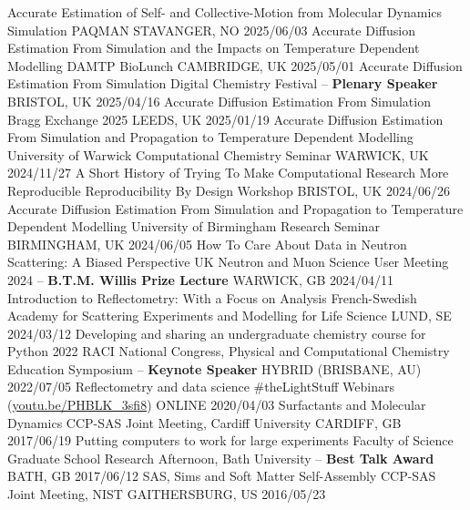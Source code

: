 \vspace{-0.4cm}
\begin{cvhonors}
  \cvhonor
    {Accurate Estimation of Self- and Collective-Motion from Molecular Dynamics Simulation}
    {PAQMAN}
    {STAVANGER, NO}
    {2025/06/03}
  \cvhonor
    {Accurate Diffusion Estimation From Simulation and the Impacts on Temperature Dependent Modelling}
    {DAMTP BioLunch}
    {CAMBRIDGE, UK}
    {2025/05/01}
  \cvhonor
    {Accurate Diffusion Estimation From Simulation}
    {Digital Chemistry Festival -- \textbf{Plenary Speaker}} 
    {BRISTOL, UK}
    {2025/04/16}  
  \cvhonor
    {Accurate Diffusion Estimation From Simulation}
    {Bragg Exchange 2025}
    {LEEDS, UK}
    {2025/01/19}
  \cvhonor
    {Accurate Diffusion Estimation From Simulation and Propagation to Temperature Dependent Modelling}
    {University of Warwick Computational Chemistry Seminar}
    {WARWICK, UK}
    {2024/11/27}
  \cvhonor
    {A Short History of Trying To Make Computational Research More Reproducible}
    {Reproducibility By Design Workshop}
    {BRISTOL, UK}
    {2024/06/26}
  \cvhonor
    {Accurate Diffusion Estimation From Simulation and Propagation to Temperature Dependent Modelling}
    {University of Birmingham Research Seminar}
    {BIRMINGHAM, UK}
    {2024/06/05}
  \cvhonor
    {How To Care About Data in Neutron Scattering: A Biased Perspective}
    {UK Neutron and Muon Science User Meeting 2024 -- \textbf{B.T.M. Willis Prize Lecture}}
    {WARWICK, GB}
    {2024/04/11}
  \cvhonor
    {Introduction to Reflectometry: With a Focus on Analysis}
    {French-Swedish Academy for Scattering Experiments and Modelling for Life Science}
    {LUND, SE}
    {2024/03/12}
  \cvhonor
    {Developing and sharing an undergraduate chemistry course for Python}
    {2022 RACI National Congress, Physical and Computational Chemistry Education Symposium -- \textbf{Keynote Speaker}}
    {HYBRID (BRISBANE, AU)}
    {2022/07/05}
  \cvhonor
    {Reflectometry and data science}
    {\#theLightStuff Webinars (\href{https://youtu.be/PHBLK_3sfi8}{youtu.be/PHBLK\_3sfi8})}
    {ONLINE}
    {2020/04/03}
  \cvhonor
    {Surfactants and Molecular Dynamics}
    {CCP-SAS Joint Meeting, Cardiff University}
    {CARDIFF, GB}
    {2017/06/19}
  \cvhonor
    {Putting computers to work for large experiments}
    {Faculty of Science Graduate School Research Afternoon, Bath University -- \textbf{Best Talk Award}}
    {BATH, GB}
    {2017/06/12}
  \cvhonor
    {SAS, Sims and Soft Matter Self-Assembly}
    {CCP-SAS Joint Meeting, NIST}
    {GAITHERSBURG, US}
    {2016/05/23}
\end{cvhonors}
